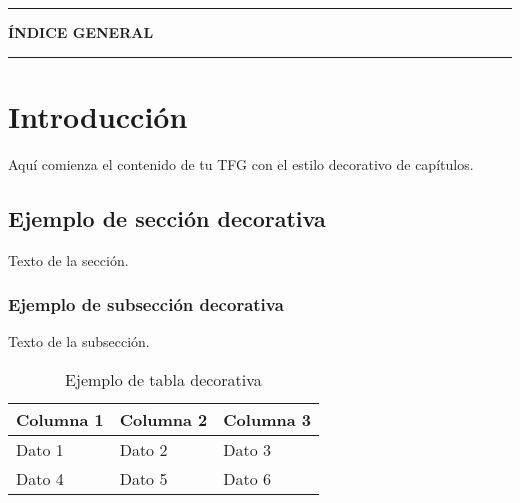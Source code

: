 \documentclass[12pt,a4paper]{book}
\begin{document}
\begin{center}
    {\color{usred}\textbf{\thepage}}
\end{center}

\newpage
\thispagestyle{plain}
\setcounter{page}{3}
\noindent
\color{usred}\rule{\textwidth}{3pt}
\vspace{1.5cm}

\begin{center}
    {\LARGE\bfseries\color{usred} ÍNDICE GENERAL}
\end{center}

\vspace{1cm}

\tableofcontents

\vfill
\color{usred}\rule{\textwidth}{3pt}

\begin{center}
    {\color{usred}\textbf{\thepage}}
\end{center}

\newpage
{}
\setcounter{page}{1}

\chapter{Introducción}
Aquí comienza el contenido de tu TFG con el estilo decorativo de capítulos.

\section{Ejemplo de sección decorativa}
Texto de la sección.

\subsection{Ejemplo de subsección decorativa}
Texto de la subsección.

\begin{table}[h!]
\centering
{}
\begin{tabular}{L{4cm}C{3cm}R{3cm}}
\toprule
{}
\textbf{Columna 1} & \textbf{Columna 2} & \textbf{Columna 3} \\
\midrule
Dato 1 & Dato 2 & Dato 3 \\
Dato 4 & Dato 5 & Dato 6 \\
\bottomrule
\end{tabular}
\caption{Ejemplo de tabla decorativa}
\end{table}
\end{document}
